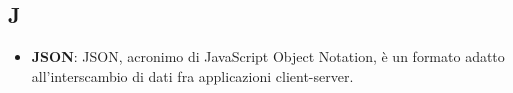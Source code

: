 \subsection{J}
\begin{itemize}
	\item
	\textbf{JSON}: JSON, acronimo di JavaScript Object Notation, è un formato adatto all'interscambio di dati fra applicazioni client-server.
\end{itemize}